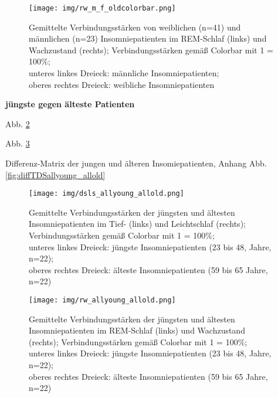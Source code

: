 \begin{figure}[H]
	\centering
	\texttt{[image: img/rw\_m\_f\_oldcolorbar.png]}
	\caption[Verbindungsstärken von weiblichen und männlichen Insomniepatienten]{Gemittelte Verbindungsstärken von weiblichen (n=41) und männlichen (n=23) Insomniepatienten im REM-Schlaf (links) und Wachzustand (rechts); Verbindungsstärken gemäß Colorbar mit 1 = 100\%;\\unteres linkes Dreieck: männliche Insomniepatienten;\\oberes rechtes Dreieck: weibliche Insomniepatienten}
	\label{fig:rw_m_f}
\end{figure}






\textbf{jüngste gegen älteste Patienten}

Abb. \ref{fig:dsls_allyoung_allold}

Abb. \ref{fig:rw_allyoung_allold}

Differenz-Matrix der jungen und älteren Insomiepatienten, Anhang Abb. \ref{fig:diffTDSallyoung_allold}

\begin{figure}[H]
	\centering
	\texttt{[image: img/dsls\_allyoung\_allold.png]}
	\caption[Verbindungsstärken der jüngsten und ältesten Insomniepatienten im Tief- und Leichtschlaf]{Gemittelte Verbindungsstärken der jüngsten und ältesten Insomniepatienten im Tief- (links) und Leichtschlaf (rechts); Verbindungsstärken gemäß Colorbar mit 1 = 100\%;\\unteres linkes Dreieck: jüngste Insomniepatienten (23 bis 48, Jahre, n=22);\\oberes rechtes Dreieck: älteste Insomniepatienten (59 bis 65 Jahre, n=22)}
	\label{fig:dsls_allyoung_allold}
\end{figure}

\begin{figure}[H]
	\centering
	\texttt{[image: img/rw\_allyoung\_allold.png]}
	\caption[Verbindungsstärken der jüngsten und ältesten Insomniepatienten im REM-Schlaf und Wachzustand]{Gemittelte Verbindungsstärken der jüngsten und ältesten Insomniepatienten im REM-Schlaf (links) und Wachzustand (rechts); Verbindungsstärken gemäß Colorbar mit 1 = 100\%;\\unteres linkes Dreieck: jüngste Insomniepatienten (23 bis 48, Jahre, n=22);\\oberes rechtes Dreieck: älteste Insomniepatienten (59 bis 65 Jahre, n=22)}
	\label{fig:rw_allyoung_allold}
\end{figure}





